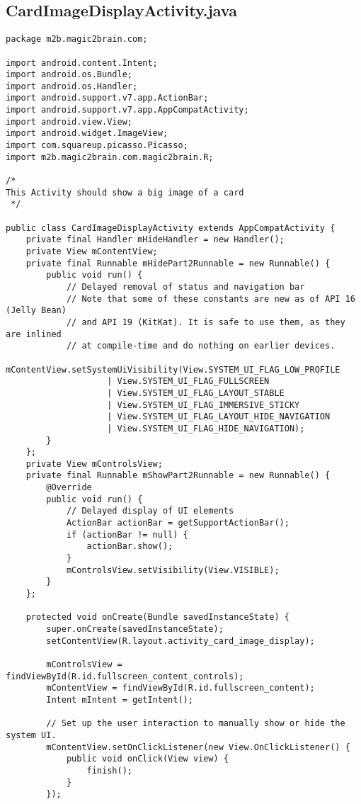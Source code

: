 \subsection*{CardImageDisplayActivity.java}
\begin{lstlisting}
package m2b.magic2brain.com;

import android.content.Intent;
import android.os.Bundle;
import android.os.Handler;
import android.support.v7.app.ActionBar;
import android.support.v7.app.AppCompatActivity;
import android.view.View;
import android.widget.ImageView;
import com.squareup.picasso.Picasso;
import m2b.magic2brain.com.magic2brain.R;

/*
This Activity should show a big image of a card
 */

public class CardImageDisplayActivity extends AppCompatActivity {
    private final Handler mHideHandler = new Handler();
    private View mContentView;
    private final Runnable mHidePart2Runnable = new Runnable() {
        public void run() {
            // Delayed removal of status and navigation bar
            // Note that some of these constants are new as of API 16 (Jelly Bean)
            // and API 19 (KitKat). It is safe to use them, as they are inlined
            // at compile-time and do nothing on earlier devices.
            mContentView.setSystemUiVisibility(View.SYSTEM_UI_FLAG_LOW_PROFILE
                    | View.SYSTEM_UI_FLAG_FULLSCREEN
                    | View.SYSTEM_UI_FLAG_LAYOUT_STABLE
                    | View.SYSTEM_UI_FLAG_IMMERSIVE_STICKY
                    | View.SYSTEM_UI_FLAG_LAYOUT_HIDE_NAVIGATION
                    | View.SYSTEM_UI_FLAG_HIDE_NAVIGATION);
        }
    };
    private View mControlsView;
    private final Runnable mShowPart2Runnable = new Runnable() {
        @Override
        public void run() {
            // Delayed display of UI elements
            ActionBar actionBar = getSupportActionBar();
            if (actionBar != null) {
                actionBar.show();
            }
            mControlsView.setVisibility(View.VISIBLE);
        }
    };

    protected void onCreate(Bundle savedInstanceState) {
        super.onCreate(savedInstanceState);
        setContentView(R.layout.activity_card_image_display);

        mControlsView = findViewById(R.id.fullscreen_content_controls);
        mContentView = findViewById(R.id.fullscreen_content);
        Intent mIntent = getIntent();

        // Set up the user interaction to manually show or hide the system UI.
        mContentView.setOnClickListener(new View.OnClickListener() {
            public void onClick(View view) {
                finish();
            }
        });


\end{lstlisting}
